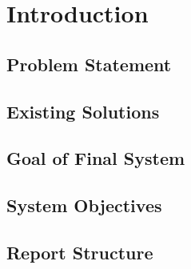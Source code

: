 \chapter{Introduction}

\section{Problem Statement}

\section{Existing Solutions}

\section{Goal of Final System}

\section{System Objectives}

\section{Report Structure}